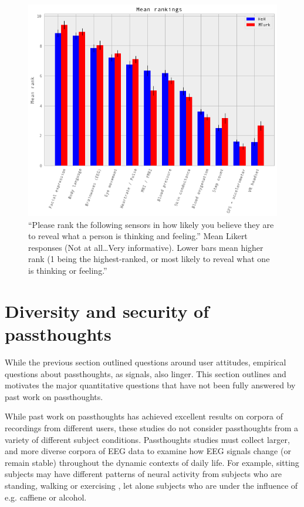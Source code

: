 \documentclass[sigconf]{acmart}
\begin{document}
\label{fig:rank}
\begin{figure}
\centering
\includegraphics[width=.9\linewidth]{./figures/rankings.png}
\caption{``Please rank the following sensors in how likely you believe they are to reveal what a person is thinking and feeling.'' Mean Likert responses (Not at all\ldots{}Very informative). Lower bars mean higher rank (1 being the highest-ranked,  or most likely to reveal what one is thinking or feeling.''}
\end{figure}



\section{Diversity and security of passthoughts}
\label{sec:orge34b851}

While the previous section outlined questions around user attitudes, empirical questions about passthoughts, as signals, also linger.
This section outlines and motivates the major quantitative questions that have not been fully answered by past work on passthoughts.

While past work on passthoughts has achieved excellent results on corpora of recordings from different users, 
these studies do not consider passthoughts from a variety of different subject conditions.
Passthoughts studies must collect larger, and more diverse corpora of EEG data to examine how EEG signals change (or remain stable) throughout the dynamic contexts of daily life.
For example, sitting subjects may have different patterns of neural activity from subjects who are standing, walking or exercising \cite{Thibault2016a},
let alone subjects who are under the influence of e.g. caffiene or alcohol.
\end{document}
